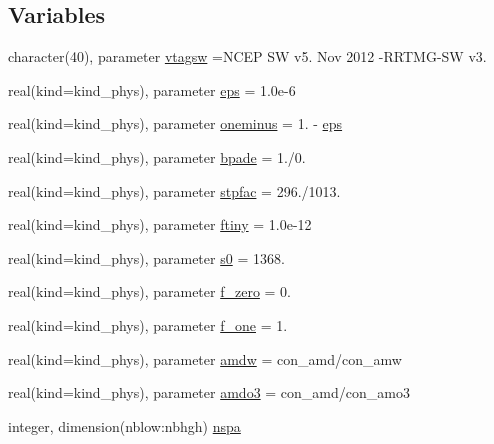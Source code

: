 \subsection*{Variables}
\begin{DoxyCompactItemize}
\item 
character(40), parameter \hyperlink{namespacemodule__radsw__main_a93334abce2ca8bfdcdfe5edd4ae1f093}{vtagsw} =\textquotesingle{}N\+C\+EP SW v5. Nov 2012 -\/R\+R\+T\+MG-\/SW v3. \textquotesingle{}
\item 
real(kind=kind\+\_\+phys), parameter \hyperlink{group__module__radsw__main_ga7d311ceb7f824ea31d31ba8144751b5a}{eps} = 1.\+0e-\/6
\item 
real(kind=kind\+\_\+phys), parameter \hyperlink{group__module__radsw__main_gac666738c31ea648cae506a47e5a4e43d}{oneminus} = 1. -\/ \hyperlink{group__module__radsw__main_ga7d311ceb7f824ea31d31ba8144751b5a}{eps}
\item 
real(kind=kind\+\_\+phys), parameter \hyperlink{group__module__radsw__main_gacd9ae7c14cbfdc55f1f0fff637ca0331}{bpade} = 1./0.
\item 
real(kind=kind\+\_\+phys), parameter \hyperlink{group__module__radsw__main_ga4d32ea8f0f1bca37e3351a5ae5077f77}{stpfac} = 296./1013.
\item 
real(kind=kind\+\_\+phys), parameter \hyperlink{group__module__radsw__main_gabe91ed52b6016e99a2d0c874524fb27f}{ftiny} = 1.\+0e-\/12
\item 
real(kind=kind\+\_\+phys), parameter \hyperlink{group__module__radsw__main_ga244c149eb05c0675a7e040dbf7e2bc4b}{s0} = 1368.
\item 
real(kind=kind\+\_\+phys), parameter \hyperlink{group__module__radsw__main_gad54ac2d2bd5c4b3bd692c76d2a0bcc5d}{f\+\_\+zero} = 0.
\item 
real(kind=kind\+\_\+phys), parameter \hyperlink{group__module__radsw__main_gad256aaca9c9d6b5d161ae21f68989db6}{f\+\_\+one} = 1.
\item 
real(kind=kind\+\_\+phys), parameter \hyperlink{group__module__radsw__main_ga1445a63250d89083447371120c484618}{amdw} = con\+\_\+amd/con\+\_\+amw
\item 
real(kind=kind\+\_\+phys), parameter \hyperlink{group__module__radsw__main_ga527e5e1cec6ad0800f69a606fde77369}{amdo3} = con\+\_\+amd/con\+\_\+amo3
\item 
integer, dimension(nblow\+:nbhgh) \hyperlink{group__module__radsw__main_ga4c0fc140a51c619089128f52e4bb878c}{nspa}
\item 

\end{DoxyCompactItemize}
